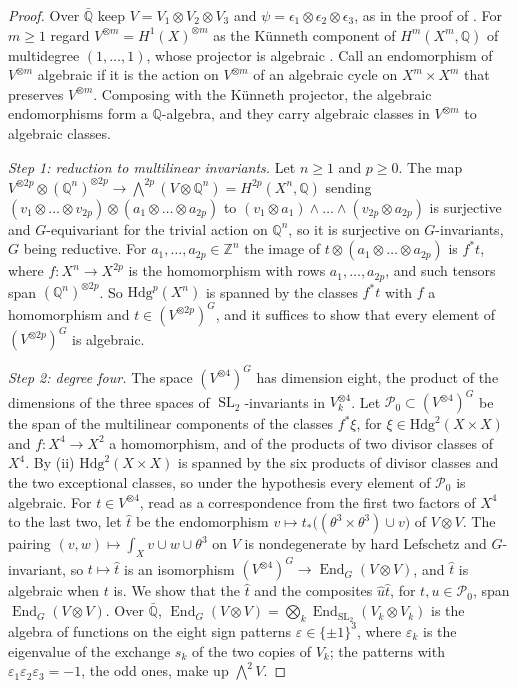 \documentclass[11pt,reqno]{amsart}
\theoremstyle{plain}
\theoremstyle{definition}
\theoremstyle{remark}
\newcommand{\QQ}{\mathbb{Q}}
\newcommand{\ZZ}{\mathbb{Z}}
\newcommand{\cP}{\mathcal{P}}
\newcommand{\Hdg}{\mathrm{Hdg}}
\DeclareMathOperator{\End}{End}
\DeclareMathOperator{\SL}{SL}
\begin{document}
\begin{proof}
Over $\bar{\QQ}$ keep $V=V_{1}\otimes V_{2}\otimes V_{3}$ and
$\psi=\epsilon_{1}\otimes\epsilon_{2}\otimes\epsilon_{3}$, as in the proof of
. For $m\ge1$ regard $V^{\otimes m}=H^{1}(X)^{\otimes m}$
as the K\"unneth component of $H^{m}(X^{m},\QQ)$ of multidegree
$(1,\dots,1)$, whose projector is algebraic \cite[\S2]{Kle68}. Call an
endomorphism of $V^{\otimes m}$ algebraic if it is the action on
$V^{\otimes m}$ of an algebraic cycle on $X^{m}\times X^{m}$ that preserves
$V^{\otimes m}$. Composing with the K\"unneth projector, the algebraic
endomorphisms form a $\QQ$-algebra, and they carry algebraic classes in
$V^{\otimes m}$ to algebraic classes.

\emph{Step 1: reduction to multilinear invariants.} Let $n\ge1$ and $p\ge0$.
The map $V^{\otimes2p}\otimes(\QQ^{n})^{\otimes2p}\to
\bigwedge^{2p}(V\otimes\QQ^{n})=H^{2p}(X^{n},\QQ)$ sending
$(v_{1}\otimes\dots\otimes v_{2p})\otimes(a_{1}\otimes\dots\otimes a_{2p})$ to
$(v_{1}\otimes a_{1})\wedge\dots\wedge(v_{2p}\otimes a_{2p})$ is surjective
and $G$-equivariant for the trivial action on $\QQ^{n}$, so it is surjective
on $G$-invariants, $G$ being reductive. For $a_{1},\dots,a_{2p}\in\ZZ^{n}$
the image of $t\otimes(a_{1}\otimes\dots\otimes a_{2p})$ is $f^{*}t$, where
$f\colon X^{n}\to X^{2p}$ is the homomorphism with rows $a_{1},\dots,a_{2p}$,
and such tensors span $(\QQ^{n})^{\otimes2p}$. So $\Hdg^{p}(X^{n})$ is
spanned by the classes $f^{*}t$ with $f$ a homomorphism and
$t\in(V^{\otimes2p})^{G}$, and it suffices to show that every element of
$(V^{\otimes2p})^{G}$ is algebraic.

\emph{Step 2: degree four.} The space $(V^{\otimes4})^{G}$ has dimension
eight, the product of the dimensions of the three spaces of
$\SL_{2}$-invariants in $V_{k}^{\otimes4}$. Let $\cP_{0}\subset
(V^{\otimes4})^{G}$ be the span of the multilinear components of the classes
$f^{*}\xi$, for $\xi\in\Hdg^{2}(X\times X)$ and $f\colon X^{4}\to X^{2}$ a
homomorphism, and of the products of two divisor classes of $X^{4}$. By
(ii) $\Hdg^{2}(X\times X)$ is spanned by the six
products of divisor classes and the two exceptional classes, so under the
hypothesis every element of $\cP_{0}$ is algebraic. For
$t\in V^{\otimes4}$, read as a correspondence from the first two factors of
$X^{4}$ to the last two, let $\hat{t}$ be the endomorphism
$v\mapsto t_{*}\bigl((\theta^{3}\times\theta^{3})\cup v\bigr)$ of
$V\otimes V$. The pairing $(v,w)\mapsto\int_{X}v\cup w\cup\theta^{3}$ on $V$
is nondegenerate by hard Lefschetz and $G$-invariant, so $t\mapsto\hat{t}$
is an isomorphism $(V^{\otimes4})^{G}\to\End_{G}(V\otimes V)$, and $\hat{t}$
is algebraic when $t$ is. We show that the $\hat{t}$ and the composites
$\hat{u}\hat{t}$, for $t,u\in\cP_{0}$, span $\End_{G}(V\otimes V)$. Over
$\bar{\QQ}$, $\End_{G}(V\otimes V)=\bigotimes_{k}\End_{\SL_{2}}(V_{k}\otimes
V_{k})$ is the algebra of functions on the eight sign patterns
$\varepsilon\in\{\pm1\}^{3}$, where $\varepsilon_{k}$ is the eigenvalue of the
exchange $s_{k}$ of the two copies of $V_{k}$; the patterns with
$\varepsilon_{1}\varepsilon_{2}\varepsilon_{3}=-1$, the odd ones, make up
$\bigwedge^{2}V$.


\end{proof}
\end{document}

